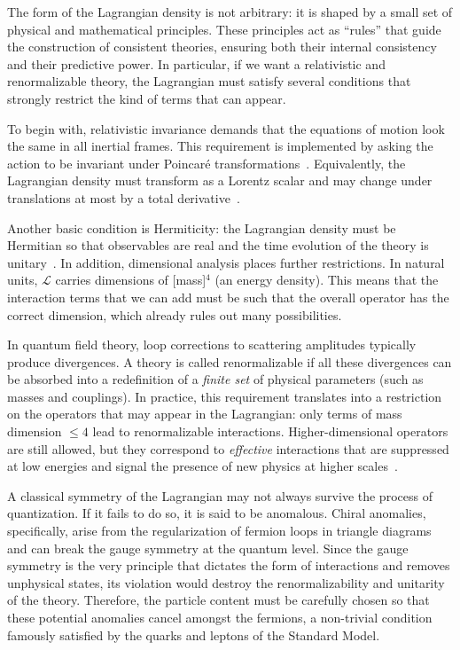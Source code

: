 The form of the Lagrangian density is not arbitrary: it is shaped by a small set of physical and mathematical principles. These principles act as ``rules'' that guide the construction of consistent theories, ensuring both their internal consistency and their predictive power. In particular, if we want a relativistic and renormalizable theory, the Lagrangian must satisfy several conditions that strongly restrict the kind of terms that can appear.

To begin with, relativistic invariance demands that the equations of motion look the same in all inertial frames. This requirement is implemented by asking the action to be invariant under Poincaré transformations~\parencite{pall}. Equivalently, the Lagrangian density must transform as a Lorentz scalar and may change under translations at most by a total derivative~\parencite{jose1998classical}. 

Another basic condition is Hermiticity: the Lagrangian density must be Hermitian so that observables are real and the time evolution of the theory is unitary~\parencite{pall,peskin}. In addition, dimensional analysis places further restrictions. In natural units, $\mathcal{L}$ carries dimensions of [mass]$^4$ (an energy density). This means that the interaction terms that we can add must be such that the overall operator has the correct dimension, which already rules out many possibilities. 

In quantum field theory, loop corrections to scattering amplitudes typically produce divergences. A theory is called renormalizable if all these divergences can be absorbed into a redefinition of a \emph{finite set} of physical parameters (such as masses and couplings). In practice, this requirement translates into a restriction on the operators that may appear in the Lagrangian: only terms of mass dimension $\leq 4$ lead to renormalizable interactions. Higher-dimensional operators are still allowed, but they correspond to \emph{effective} interactions that are suppressed at low energies and signal the presence of new physics at higher scales~\parencite{peskin,Weinberg}. 

A classical symmetry of the Lagrangian may not always survive the process of quantization. If it fails to do so, it is said to be anomalous. Chiral anomalies, specifically, arise from the regularization of fermion loops in triangle diagrams and can break the gauge symmetry at the quantum level. Since the gauge symmetry is the very principle that dictates the form of interactions and removes unphysical states, its violation would destroy the renormalizability and unitarity of the theory. Therefore, the particle content must be carefully chosen so that these potential anomalies cancel amongst the fermions, a non-trivial condition famously satisfied by the quarks and leptons of the Standard Model.

